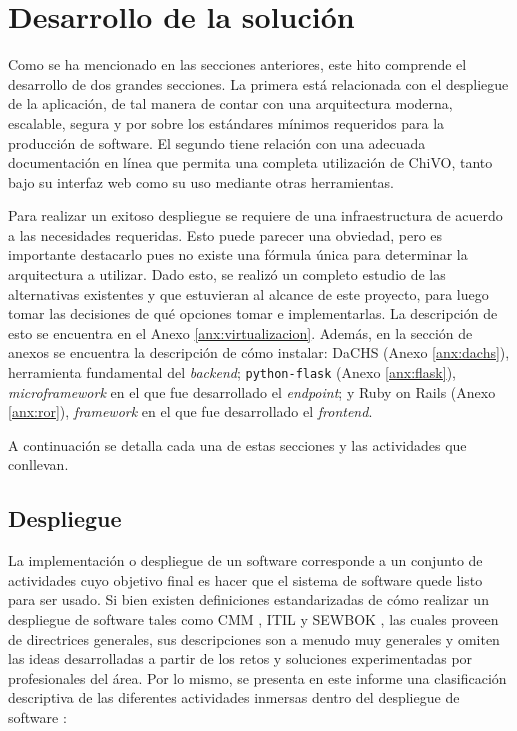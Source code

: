 \section{Desarrollo de la solución}

Como se ha mencionado en las secciones anteriores, este hito comprende el desarrollo de dos grandes secciones. La primera está relacionada con el despliegue de la aplicación, de tal manera de contar con una arquitectura moderna, escalable, segura y por sobre los estándares mínimos requeridos para la producción de software. El segundo tiene relación con una adecuada documentación en línea que permita una completa utilización de ChiVO, tanto bajo su interfaz web como su uso mediante otras herramientas.

Para realizar un exitoso despliegue se requiere de una infraestructura de acuerdo a las necesidades requeridas. Esto puede parecer una obviedad, pero es importante destacarlo pues no existe una fórmula única para determinar la arquitectura a utilizar. Dado esto, se realizó un completo estudio de las alternativas existentes y que estuvieran al alcance de este proyecto, para luego tomar las decisiones de qu\'e opciones tomar e implementarlas. La descripción de esto se encuentra en el Anexo \ref{anx:virtualizacion}. Además, en la sección de anexos se encuentra la descripción de cómo instalar: DaCHS (Anexo \ref{anx:dachs}), herramienta fundamental del \emph{backend}; \texttt{python-flask} (Anexo \ref{anx:flask}), \emph{microframework} en el que fue desarrollado el \emph{endpoint}; y Ruby on Rails (Anexo \ref{anx:ror}), \emph{framework} en el que fue desarrollado el \emph{frontend}.

A continuación se detalla cada una de estas secciones y las actividades que conllevan.

\subsection{Despliegue}

La implementación o despliegue de un software corresponde a un conjunto de actividades cuyo objetivo final es hacer que el sistema de software quede listo para ser usado. Si bien existen definiciones estandarizadas de cómo realizar un despliegue de software tales como CMM \cite{cmm}, ITIL \cite{itil} y SEWBOK \cite{swebok}, las cuales proveen de directrices generales, sus descripciones son a menudo muy generales y omiten las ideas desarrolladas a partir de los retos y soluciones experimentadas por profesionales del área. Por lo mismo, se presenta en este informe una clasificación descriptiva de las diferentes actividades inmersas dentro del despliegue de software \cite{deployActivities}:

